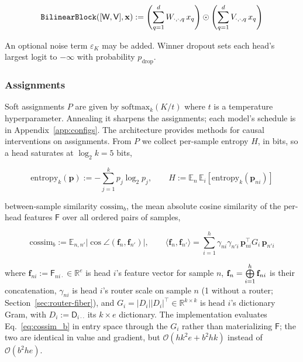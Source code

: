 \begin{equation}
	\mathop{\mathtt{BilinearBlock}}\limits([\mathsf{W},\mathsf{V}],\mathbf{x}) :=
	\left(\sum^{d}_{q=1}W_{\cdot,\cdot,q}\,x_q\right)
	 \odot \left(\sum^{d}_{q=1}V_{\cdot,\cdot,q}\,x_q\right)
	 \label{eq:bilinearblock}
\end{equation}

An optional noise term $\varepsilon_K$ may be added.
Winner dropout sets each head's largest logit to $-\infty$
with probability $p_{\mathrm{drop}}$.

\subsubsection{Assignments}
\label{sec:labels}
Soft assignments $P$ are given by $\mathrm{softmax}_{k}(K/t)$
where $t$ is a temperature hyperparameter. Annealing it sharpens the
assignments; each model's schedule is in Appendix~\ref{app:configs}.
The architecture provides methods for causal interventions on assignments.
From $P$ we collect per-sample entropy $H$, in bits, so a head
saturates at $\log_2 k = 5$ bits,

\begin{equation}
	\mathrm{entropy}_k(\mathbf{p}) :=
	-\sum^{k}_{j=1}p_{j}\log_2 p_{j},
	\qquad
	H := \mathbb{E}_{n}\,\mathbb{E}_{i}\!\left[
	\mathrm{entropy}_k(\mathbf{p}_{ni})\right]
	\label{eq:entropy}
\end{equation}

between-sample similarity $\mathrm{cossim}_b$, the mean absolute cosine
similarity of the per-head features $\mathsf{F}$ over all ordered pairs
of samples,

\begin{equation}
	\mathrm{cossim}_b :=
	\mathbb{E}_{n,n'}\big\lvert
	\cos\angle(\mathbf{f}_{n}, \mathbf{f}_{n'})
	\big\rvert,
	\qquad
	\langle \mathbf{f}_{n}, \mathbf{f}_{n'}\rangle
	= \sum^{h}_{i=1}\gamma_{ni}\gamma_{n'i}\,
	\mathbf{p}_{ni}^{\top}G_{i}\,\mathbf{p}_{n'i}
	\label{eq:cossim_b}
\end{equation}

where $\mathbf{f}_{ni} := \mathsf{F}_{ni\cdot} \in \mathbb{R}^{e}$ is
head $i$'s feature vector for sample $n$,
$\mathbf{f}_n = \mathop{\bigoplus}\limits_{i=1}^{h}\mathbf{f}_{ni}$ is their concatenation,
$\gamma_{ni}$ is head $i$'s router scale on sample $n$ (1 without a
router; Section~\ref{sec:router-fiber}), and
$G_i = \lvert D_{i}\rvert \lvert D_{i}\rvert^{\top} \in \mathbb{R}^{k \times k}$
is head $i$'s dictionary Gram, with $D_i := \mathsf{D}_{i\cdot\cdot}$ its
$k \times e$ dictionary. The implementation evaluates
Eq.~\eqref{eq:cossim_b} in entry space through the $G_i$ rather than
materializing $\mathsf{F}$; the two are identical in value and gradient,
but $\mathcal{O}(hk^2e + b^2hk)$ instead of $\mathcal{O}(b^2he)$.


